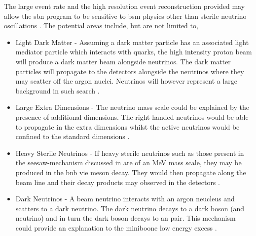 The large event rate and the high resolution event reconstruction provided may allow the \gls{sbn} program to be sensitive to \gls{bsm} physics other than sterile neutrino oscillations \cite{SBN_paper}. The potential areas include, but are not limited to,
\begin{itemize}
    \item Light Dark Matter - Assuming a dark matter particle has an associated light mediator particle which interacts with quarks, the high intensity proton beam will produce a dark matter beam alongside neutrinos. The dark matter particles will propagate to the detectors alongside the neutrinos where they may scatter off the argon nuclei. Neutrinos will however represent a large background in such search \cite{SBN_paper}. 
    \item Large Extra Dimensions - The neutrino mass scale could be explained by the presence of additional dimensions. The right handed neutrinos would be able to propagate in the extra dimensions whilst the active neutrinos would be confined to the standard dimensions \cite{SBN_paper}. 
    \item Heavy Sterile Neutrinos - If heavy sterile neutrinos such as those present in the seesaw-mechanism discussed in  are of an MeV mass scale, they may be produced in the \gls{bnb} vie meson decay. They would then propagate along the beam line and their decay products may observed in the detectors \cite{SBN_paper}\cite{MeV_scale_sterile_neutrino}.
    \item Dark Neutrinos - A beam neutrino interacts with an argon neucleus and scatters to a dark neutrino. The dark neutrino decays to a dark boson (and neutrino) and in turn the dark boson decays to an \positron \electron pair. This mechanism could provide an explanation to the \gls{miniboone} low energy excess \cite{SBN_paper}\cite{dark_neutrino}. 
\end{itemize}



            
            